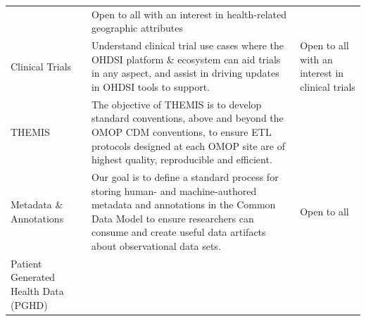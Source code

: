 \documentclass[11pt]{book}
\theoremstyle{definition}
\theoremstyle{definition}
\theoremstyle{definition}
\theoremstyle{remark}
\begin{document}
\begin{longtable}[]{@{}lll@{}}
\begin{minipage}[t]{0.51\columnwidth}
\end{minipage} & \begin{minipage}[t]{0.27\columnwidth}\raggedright
Open to all with an interest in health-related geographic attributes\strut
\end{minipage}\tabularnewline
\begin{minipage}[t]{0.13\columnwidth}\raggedright
Clinical Trials\strut
\end{minipage} & \begin{minipage}[t]{0.51\columnwidth}\raggedright
Understand clinical trial use cases where the OHDSI platform \& ecosystem can aid trials in any aspect, and assist in driving updates in OHDSI tools to support.\strut
\end{minipage} & \begin{minipage}[t]{0.27\columnwidth}\raggedright
Open to all with an interest in clinical trials\strut
\end{minipage}\tabularnewline
\begin{minipage}[t]{0.13\columnwidth}\raggedright
THEMIS\strut
\end{minipage} & \begin{minipage}[t]{0.51\columnwidth}\raggedright
The objective of THEMIS is to develop standard conventions, above and beyond the OMOP CDM conventions, to ensure ETL protocols designed at each OMOP site are of highest quality, reproducible and efficient.\strut
\end{minipage} & \begin{minipage}[t]{0.27\columnwidth}\raggedright
\strut
\end{minipage}\tabularnewline
\begin{minipage}[t]{0.13\columnwidth}\raggedright
Metadata \& Annotations\strut
\end{minipage} & \begin{minipage}[t]{0.51\columnwidth}\raggedright
Our goal is to define a standard process for storing human- and machine-authored metadata and annotations in the Common Data Model to ensure researchers can consume and create useful data artifacts about observational data sets.\strut
\end{minipage} & \begin{minipage}[t]{0.27\columnwidth}\raggedright
Open to all\strut
\end{minipage}\tabularnewline
\begin{minipage}[t]{0.13\columnwidth}\raggedright
Patient Generated Health Data (PGHD)\strut
\end{minipage} & \begin{minipage}[t]{0.51\columnwidth}\raggedright

\end{minipage}
\end{longtable}
\end{document}
